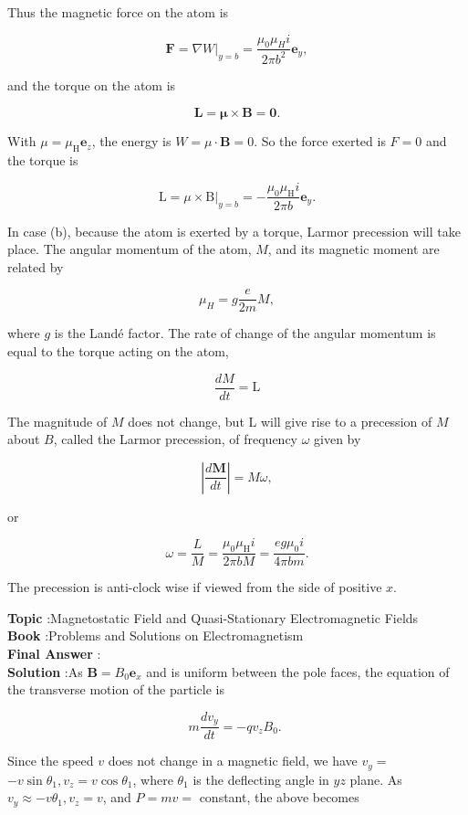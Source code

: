 \documentclass[10pt]{article}
\begin{document}
Thus the magnetic force on the atom is

$$
\mathbf{F}=\left.\nabla W\right|_{y=b}=\frac{\mu_{0} \mu_{H} i}{2 \pi b^{2}} \mathbf{e}_{y},
$$

and the torque on the atom is

$$
\mathbf{L}=\boldsymbol{\mu} \times \mathbf{B}=\mathbf{0} .
$$

 With $\mu=\mu_{\mathrm{H}} \mathbf{e}_{z}$, the energy is $W=\mu \cdot \mathbf{B}=0$. So the force exerted is $F=0$ and the torque is

$$
\mathrm{L}=\mu \times\left.\mathrm{B}\right|_{y=b}=-\frac{\mu_{0} \mu_{\mathrm{H}} i}{2 \pi b} \mathbf{e}_{y} .
$$

 In case (b), because the atom is exerted by a torque, Larmor precession will take place. The angular momentum of the atom, $M$, and its magnetic moment are related by

$$
\mu_{H}=g \frac{e}{2 m} M,
$$

where $g$ is the Landé factor. The rate of change of the angular momentum is equal to the torque acting on the atom,

$$
\frac{d M}{d t}=\mathrm{L}
$$

The magnitude of $M$ does not change, but $\mathrm{L}$ will give rise to a precession of $M$ about $B$, called the Larmor precession, of frequency $\omega$ given by

$$
\left|\frac{d \mathbf{M}}{d t}\right|=M \omega,
$$

or

$$
\omega=\frac{L}{M}=\frac{\mu_{0} \mu_{\mathrm{H}} i}{2 \pi b M}=\frac{e g \mu_{0} i}{4 \pi b m} .
$$

The precession is anti-clock wise if viewed from the side of positive $x$.

\textbf{Topic} :Magnetostatic Field and Quasi-Stationary Electromagnetic Fields\\
\textbf{Book} :Problems and Solutions on Electromagnetism\\
\textbf{Final Answer} :\\


\textbf{Solution} :As $\mathbf{B}=B_{0} \mathbf{e}_{x}$ and is uniform between the pole faces, the equation of the transverse motion of the particle is

$$
m \frac{d v_{y}}{d t}=-q v_{z} B_{0} \text {. }
$$

Since the speed $v$ does not change in a magnetic field, we have $v_{y}=$ $-v \sin \theta_{1}, v_{z}=v \cos \theta_{1}$, where $\theta_{1}$ is the deflecting angle in $y z$ plane. As $v_{y} \approx-v \theta_{1}, v_{z}=v$, and $P=m v=$ constant, the above becomes
\end{document}
